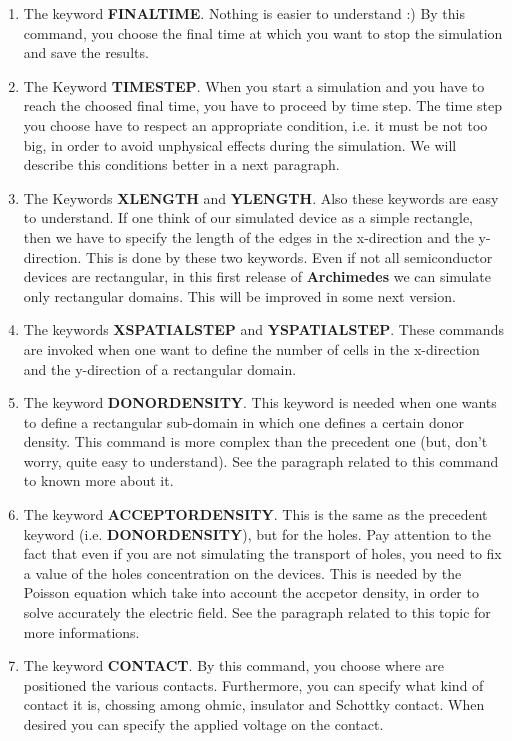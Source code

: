 \documentclass[12pt]{book}
\begin{document}
\begin{enumerate}
\item 
The keyword \textbf{FINALTIME}. Nothing is easier to understand :) By this command, you choose the final time at which you want to stop the simulation and save the results.

\item
The Keyword \textbf{TIMESTEP}. When you start a simulation and you have to reach the choosed final time, you have to proceed by time step. The time step you choose have to respect an appropriate condition, i.e. it must be not too big, in order to avoid unphysical effects during the simulation. We will describe this conditions better in a next paragraph.

\item
The Keywords \textbf{XLENGTH} and \textbf{YLENGTH}. Also these keywords are easy to understand. If one think of our simulated device as a simple rectangle, then we have to specify the length of the edges in the x-direction and the y-direction. This is done by these two keywords. Even if not all semiconductor devices are rectangular, in this first release of \textbf{Archimedes} we can simulate only rectangular domains. This will be improved in some next version.

\item
The keywords \textbf{XSPATIALSTEP} and \textbf{YSPATIALSTEP}. These commands are invoked when one want to define the number of cells in the x-direction and the y-direction of a rectangular domain.

\item
The keyword \textbf{DONORDENSITY}. This keyword is needed when one wants to define a rectangular sub-domain in which one defines a certain donor density. This command is more complex than the precedent one (but, don't worry, quite easy to understand). See the paragraph related to this command to known more about it.

\item
The keyword \textbf{ACCEPTORDENSITY}. This is the same as the precedent keyword (i.e. \textbf{DONORDENSITY}), but for the holes. Pay attention to the fact that even if you are not simulating the transport of holes, you need to fix a value of the holes concentration on the devices. This is needed by the Poisson equation which take into account the accpetor density, in order to solve accurately the electric field. See the paragraph related to this topic for more informations.

\item
The keyword \textbf{CONTACT}. By this command, you choose where are positioned the various contacts. Furthermore, you can specify what kind of contact it is, chossing among ohmic, insulator and Schottky contact. When desired you can specify the applied voltage on the contact.


\end{enumerate}
\end{document}
